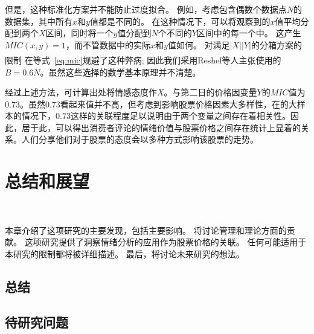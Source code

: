 \documentclass[cs4size,a4paper]{ctexart}
\numberwithin{equation}{section}
\numberwithin{table}{section}
\numberwithin{figure}{section}
\newcommand{\upcite}[1]{\textsuperscript{\textsuperscript{\cite{#1}}}}%
\begin{document}
但是，这种标准化方案并不能防止过度拟合。 例如，考虑包含偶数个数据点$N$的数据集，其中所有$x$和$y$值都是不同的。 在这种情况下，可以将观察到的$x$值平均分配到两个$X$区间，同时将一个$y$值分配到$N$个不同的$Y$区间中的每一个中。 这产生$MIC(x, y) = 1$，而不管数据中的实际$x$和$y$值如何。 对满足$|X ||Y|$的分箱方案的限制 在等式~\ref{eq:mic}规避了这种弊病; 因此我们采用Reshef等人\upcite{reshef2011detecting}主张使用的$B = 0.6N$。虽然这些选择的数学基本原理并不清楚。

经过上述方法，可计算出处将情感态度作$X$。与第二日的价格因变量$Y$的$MIC$值为$0.73$。虽然$0.73$看起来值并不高，但考虑到影响股票价格因素大多样性，在的大样本的情况下，$0.73$这样的关联程度足以说明由于两个变量之间存在着相关性。因此，居于此，可以得出消费者评论的情绪价值与股票价格之间存在统计上显着的关系。人们分享他们对于股票的态度会以多种方式影响该股票的走势。


\section{总结和展望}~\label{总结}

本章介绍了这项研究的主要发现，包括主要影响。 将讨论管理和理论方面的贡献。 这项研究提供了洞察情绪分析的应用作为股票价格的关联。 任何可能适用于本研究的限制都将被详细描述。 最后，将讨论未来研究的想法。

\subsection{总结}

\subsection{待研究问题}~\label{待研究问题}


\newpage
{}
\nocite{*}
%


%
\end{document}
